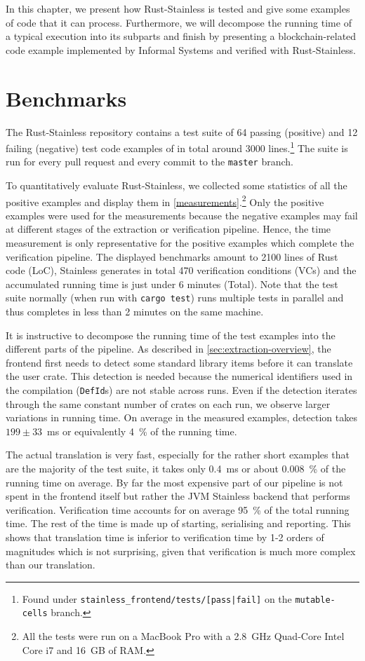 In this chapter, we present how Rust-Stainless is tested and give some examples
of code that it can process. Furthermore, we will decompose the running time of
a typical execution into its subparts and finish by presenting a
blockchain-related code example implemented by Informal Systems and verified
with Rust-Stainless.

\section{Benchmarks}

The Rust-Stainless repository contains a test suite of 64 passing (positive) and
12 failing (negative) test code examples of in total around 3000
lines.\footnote{Found under \texttt{stainless\_frontend/tests/[pass|fail]}
on the \texttt{mutable-cells} branch.} The suite is run for every pull request
and every commit to the \texttt{master} branch.

To quantitatively evaluate Rust-Stainless, we collected some statistics of all
the positive examples and display them in \autoref{measurements}.\footnote{All
the tests were run on a MacBook Pro with a 2.8~GHz Quad-Core Intel Core i7 and
16~GB of RAM.} Only the positive examples were used for the measurements because
the negative examples may fail at different stages of the extraction or
verification pipeline. Hence, the time measurement is only representative for
the positive examples which complete the verification pipeline. The displayed
benchmarks amount to 2100 lines of Rust code (LoC), Stainless generates in total
470 verification conditions (VCs) and the accumulated running time is just under
6 minutes (Total). Note that the test suite normally (when run with
\texttt{cargo test}) runs multiple tests in parallel and thus completes in less
than 2 minutes on the same machine.

It is instructive to decompose the running time of the test examples into the
different parts of the pipeline. As described in
\autoref{sec:extraction-overview}, the frontend first needs to detect some
standard library items before it can translate the user crate. This detection is
needed because the numerical identifiers used in the compilation
(\lstinline!DefId!s) are not stable across runs. Even if the detection iterates
through the same constant number of crates on each run, we observe larger
variations in running time. On average in the measured examples, detection takes
$199 \pm 33$~ms or equivalently 4~\% of the running time.

The actual translation is very fast, especially for the rather short examples
that are the majority of the test suite, it takes only 0.4~ms or about 0.008~\%
of the running time on average. By far the most expensive part of our pipeline
is not spent in the frontend itself but rather the JVM Stainless backend that
performs verification. Verification time accounts for on average 95~\% of the
total running time. The rest of the time is made up of starting, serialising and
reporting. This shows that translation time is inferior to verification time by
1-2 orders of magnitudes which is not surprising, given that verification is
much more complex than our translation.

